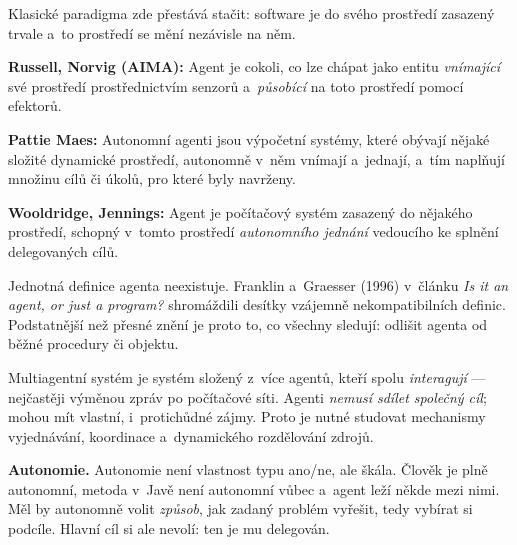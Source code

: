 \documentclass[11pt,a4paper]{article}
\theoremstyle{definition}
\begin{document}
Klasické paradigma  zde přestává stačit:
software je do svého prostředí zasazený trvale a~to prostředí se mění nezávisle na něm.

\begin{defbox}
\textbf{Russell, Norvig (AIMA):} Agent je cokoli, co lze chápat jako entitu \emph{vnímající}
své prostředí prostřednictvím senzorů a~\emph{působící} na toto prostředí pomocí efektorů.

\textbf{Pattie Maes:} Autonomní agenti jsou výpočetní systémy, které obývají nějaké složité
dynamické prostředí, autonomně v~něm vnímají a~jednají, a~tím naplňují množinu cílů či úkolů,
pro které byly navrženy.

\textbf{Wooldridge, Jennings:} Agent je počítačový systém zasazený do nějakého prostředí, schopný
v~tomto prostředí \emph{autonomního jednání} vedoucího ke splnění delegovaných cílů.
\end{defbox}

Jednotná definice agenta neexistuje. Franklin a~Graesser (1996) v~článku \emph{Is it an agent,
or just a program?} shromáždili desítky vzájemně nekompatibilních definic. Podstatnější než
přesné znění je proto to, co všechny sledují: odlišit agenta od běžné procedury či objektu.

\begin{defbox}
Multiagentní systém je systém složený z~více agentů, kteří spolu \emph{interagují} ---
nejčastěji výměnou zpráv po počítačové síti. Agenti \emph{nemusí sdílet společný cíl}; mohou mít
vlastní, i~protichůdné zájmy. Proto je nutné studovat mechanismy vyjednávání, koordinace
a~dynamického rozdělování zdrojů.
\end{defbox}

\textbf{Autonomie.} Autonomie není vlastnost typu ano/ne, ale škála. Člověk je plně autonomní,
metoda v~Javě není autonomní vůbec a~agent leží někde mezi nimi. Měl by autonomně volit
\emph{způsob}, jak zadaný problém vyřešit, tedy vybírat si podcíle. Hlavní cíl si ale nevolí:
ten je mu delegován.
\end{document}
